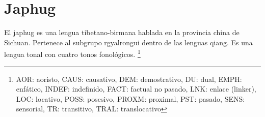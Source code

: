 \section*{Japhug}

\noindent El japhug es una lengua tibetano-birmana hablada en la provincia china de Sichuan. Pertenece al subgrupo rgyalrongui dentro de las lenguas qiang. Es una lengua tonal con cuatro tonos fonológicos.
\footnote{AOR: aoristo, CAUS: causativo, DEM: demostrativo, DU: dual, EMPH: enfático, INDEF: indefinido, FACT: factual no pasado, LNK: enlace (linker), LOC: locativo, POSS: posesivo, PROXM: proximal, PST: pasado, SENS: sensorial, TR: transitivo, TRAL: translocativo}
\vspace{0.5cm}


